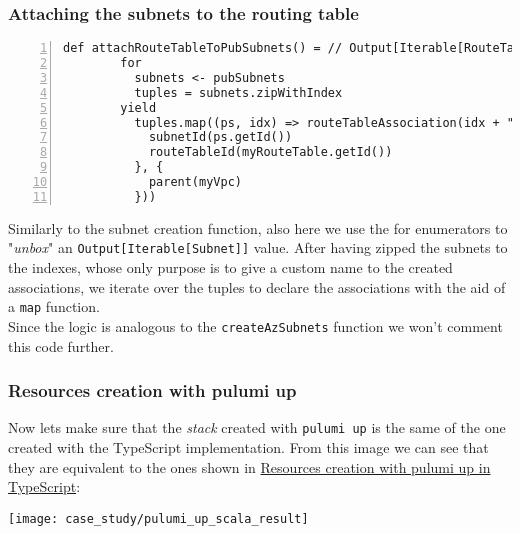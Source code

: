 \subsubsection{Attaching the subnets to the routing table}
\begin{minipage}{\linewidth}
\begin{lstlisting}[numbers=left, numberstyle=\tiny, numbersep=-5pt, stepnumber=1]
  def attachRouteTableToPubSubnets() = // Output[Iterable[RouteTableAssociation]] 
        for
          subnets <- pubSubnets
          tuples = subnets.zipWithIndex
        yield
          tuples.map((ps, idx) => routeTableAssociation(idx + "-assoc-scala") ({
            subnetId(ps.getId())
            routeTableId(myRouteTable.getId())
          }, {
            parent(myVpc)
          }))
\end{lstlisting}
\end{minipage}
Similarly to the subnet creation function, also here we use the for enumerators to "\textit{unbox}" an \texttt{Output[Iterable[Subnet]]} value.
After having zipped the subnets to the indexes, whose only purpose is to give a custom name to the created associations, we iterate over the tuples to declare the associations with the aid of a \texttt{map} function.\\
Since the logic is analogous to the \texttt{createAzSubnets} function we won't comment this code further.

\subsubsection{Resources creation with pulumi up}
\label{sssec:res-cre-ts}
Now lets make sure that the \textit{stack} created with \texttt{pulumi up} is the same of the one created with the TypeScript implementation.
From this image we can see that they are equivalent to the ones shown in \hyperref[sssec:res-cre-ts]{Resources creation with pulumi up in TypeScript}:
\begin{center}
  \texttt{[image: case\_study/pulumi\_up\_scala\_result]} 
\end{center}\mbox{}\\


